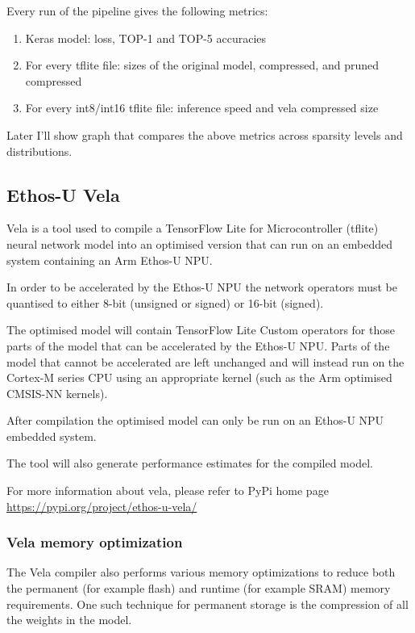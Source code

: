 Every run of the pipeline gives the following metrics:
\begin{enumerate}
    \item Keras model: loss, TOP-1 and TOP-5 accuracies
    \item For every tflite file: sizes of the original model, compressed, and
        pruned compressed
    \item For every int8/int16 tflite file: inference speed and vela compressed
        size
\end{enumerate}

Later I'll show graph that compares the above metrics across sparsity levels
and distributions.

\subsection{Ethos-U Vela}\label{sub:vela}
Vela is a tool used to compile a TensorFlow Lite for Microcontroller (tflite)
neural network model into an optimised version that can run on an embedded
system containing an Arm Ethos-U NPU\@.

In order to be accelerated by the Ethos-U NPU the network operators must be
quantised to either 8-bit (unsigned or signed) or 16-bit (signed).

The optimised model will contain TensorFlow Lite Custom operators for those
parts of the model that can be accelerated by the Ethos-U NPU\@. Parts of the
model that cannot be accelerated are left unchanged and will instead run on the
Cortex-M series CPU using an appropriate kernel (such as the Arm optimised
CMSIS-NN kernels).

After compilation the optimised model can only be run on an Ethos-U NPU
embedded system.

The tool will also generate performance estimates for the compiled model.

For more information about vela, please refer to PyPi home page
\url{https://pypi.org/project/ethos-u-vela/}

\subsubsection{Vela memory optimization}\label{subsub:vela_memory_optimization}
The Vela compiler also performs various memory optimizations to reduce both the
permanent (for example flash) and runtime (for example SRAM) memory
requirements.
One such technique for permanent storage is the compression of all the weights
in the model.

